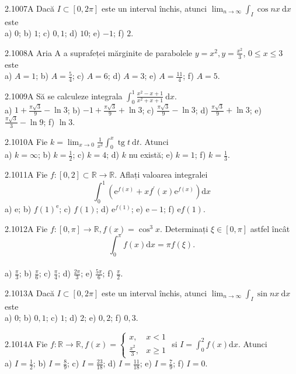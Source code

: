 \documentclass[11pt]{article}
\begin{document}
2.1007A Dacă $I \subset[0,2 \pi]$ este un interval închis, atunci $\lim _{n \rightarrow \infty} \int_{I} \cos n x \mathrm{~d} x$ este\\ a) $0$; b) $1$; c) $0,1$; d) $10$; e) $-1$; f) $2$.

2.1008A Aria A a suprafeței mărginite de parabolele $y=x^{2}, y=\frac{x^{2}}{3}$, $0 \leq x \leq 3$ este\\ a) $A=1$; b) $A=\frac{5}{4}$; c) $A=6$; d) $A=3$; e) $A=\frac{11}{4}$; f) $A=5$.

2.1009A Să se calculeze integrala $\int_{0}^{1} \frac{x^{2}-x+1}{x^{2}+x+1} \mathrm{~d} x$.\\ a) $1+\frac{\pi \sqrt{3}}{9}-\ln 3$; b) $-1+\frac{\pi \sqrt{3}}{9}+\ln 3$; c) $\frac{\pi \sqrt{3}}{9}-\ln 3$; d) $\frac{\pi \sqrt{3}}{9}+\ln 3$; e) $\frac{\pi \sqrt{3}}{3}-\ln 9$; f) $\ln 3$.

2.1010A Fie $k=\lim _{x \rightarrow 0} \frac{1}{x^{2}} \int_{0}^{x} \operatorname{tg} t \mathrm{~d} t$. Atunci\\ a) $k=\infty$; b) $k=\frac{1}{2}$; c) $k=4$; d) $k$ nu există; e) $k=1$; f) $k=\frac{1}{3}$.

2.1011A Fie $f:[0,2] \subset \mathbb{R} \rightarrow \mathbb{R}$. Aflați valoarea integralei\\ $$\int_{0}^{1}\left(\mathrm{e}^{f(x)}+x f^{\prime}(x) \mathrm{e}^{f(x)}\right) \mathrm{d} x$$ a) $\mathrm{e}$; b) $f(1)^{\mathrm{e}}$; c) $f(1)$; d) $\mathrm{e}^{f(1)}$; e) $\mathrm{e}-1$; f) $\mathrm{e} f(1)$.

2.1012A Fie $f:[0, \pi] \rightarrow \mathbb{R}, f(x)=\cos ^{3} x$. Determinați $\xi \in[0, \pi]$ astfel încât $$\int_{0}^{\pi} f(x) \mathrm{d} x=\pi f(\xi).$$\\ a) $\frac{\pi}{3}$; b) $\frac{\pi}{6}$; c) $\frac{\pi}{4}$; d) $\frac{2 \pi}{3}$; e) $\frac{5 \pi}{6}$; f) $\frac{\pi}{2}$.

2.1013A Dacă $I \subset[0,2 \pi]$ este un interval închis, atunci $\lim _{n \rightarrow \infty} \int_{I} \sin n x \mathrm{~d} x$ este\\ a) $0$; b) $0,1$; c) $1$; d) $2$; e) $0,2$; f) $0,3$.

2.1014A Fie $f: \mathbb{R} \rightarrow \mathbb{R}, f(x)=\left\{\begin{array}{ll}x, & x<1 \\ \frac{x^{2}}{3}, & x \geq 1\end{array}\right.$ si $I=\int_{0}^{2} f(x) \mathrm{d} x$. Atunci\\ a) $I=\frac{1}{2}$; b) $I=\frac{8}{9}$; c) $I=\frac{23}{18}$; d) $I=\frac{11}{18}$; e) $I=\frac{7}{9}$; f) $I=0$.
\end{document}
